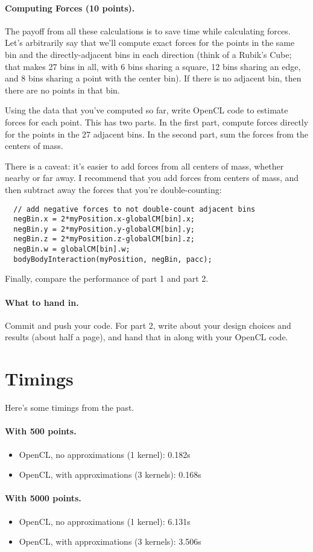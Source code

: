 \documentclass[letterpaper,10pt]{article}
\begin{document}
\paragraph{Computing Forces (10 points).}
The payoff from all these calculations is to save time while
calculating forces. Let's arbitrarily say that we'll compute exact
forces for the points in the same bin and the directly-adjacent bins
in each direction (think of a Rubik's Cube; that makes 27 bins in all,
with 6 bins sharing a square, 12 bins sharing an edge, and 8 bins
sharing a point with the center bin). If there is no adjacent bin,
then there are no points in that bin. 

Using the data that you've
computed so far, write OpenCL code to estimate forces for each point.
This has two parts. In the first part, compute forces directly for the 
points in the 27 adjacent bins. In the second part, 
sum the forces from the centers of mass. 

There is a caveat: it's easier to add forces from all centers of mass,
whether nearby or far away. I recommend that you add forces from centers
of mass, and then subtract away the forces that you're double-counting:

\begin{verbatim}
  // add negative forces to not double-count adjacent bins
  negBin.x = 2*myPosition.x-globalCM[bin].x;
  negBin.y = 2*myPosition.y-globalCM[bin].y;
  negBin.z = 2*myPosition.z-globalCM[bin].z;
  negBin.w = globalCM[bin].w;
  bodyBodyInteraction(myPosition, negBin, pacc);
\end{verbatim}

Finally, compare the performance of part 1 and part 2.

\paragraph{What to hand in.} Commit and push your code.
For part 2,
write about your design choices and results (about half a page), and
hand that in along with your OpenCL code.

\section*{Timings}
Here's some timings from the past.

\paragraph{With 500 points.}
\begin{itemize}
\item    OpenCL, no approximations (1 kernel): 0.182s
\item    OpenCL, with approximations (3 kernels): 0.168s
\end{itemize}

\paragraph{With 5000 points.}
\begin{itemize}
\item    OpenCL, no approximations (1 kernel): 6.131s
\item    OpenCL, with approximations (3 kernels): 3.506s
\end{itemize}
\end{document}

